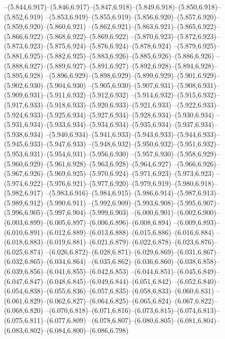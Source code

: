   --(5.844,6.917)--(5.846,6.917)--(5.847,6.918)--(5.849,6.918)--(5.850,6.918)--(5.852,6.919)%
  --(5.853,6.919)--(5.855,6.919)--(5.856,6.920)--(5.857,6.920)--(5.859,6.920)--(5.860,6.921)%
  --(5.862,6.921)--(5.863,6.921)--(5.865,6.922)--(5.866,6.922)--(5.868,6.922)--(5.869,6.922)%
  --(5.870,6.923)--(5.872,6.923)--(5.873,6.923)--(5.875,6.924)--(5.876,6.924)--(5.878,6.924)%
  --(5.879,6.925)--(5.881,6.925)--(5.882,6.925)--(5.883,6.926)--(5.885,6.926)--(5.886,6.926)%
  --(5.888,6.927)--(5.889,6.927)--(5.891,6.927)--(5.892,6.928)--(5.894,6.928)--(5.895,6.928)%
  --(5.896,6.929)--(5.898,6.929)--(5.899,6.929)--(5.901,6.929)--(5.902,6.930)--(5.904,6.930)%
  --(5.905,6.930)--(5.907,6.931)--(5.908,6.931)--(5.909,6.931)--(5.911,6.932)--(5.912,6.932)%
  --(5.914,6.932)--(5.915,6.932)--(5.917,6.933)--(5.918,6.933)--(5.920,6.933)--(5.921,6.933)%
  --(5.922,6.933)--(5.924,6.933)--(5.925,6.934)--(5.927,6.934)--(5.928,6.934)--(5.930,6.934)%
  --(5.931,6.934)--(5.933,6.934)--(5.934,6.934)--(5.935,6.934)--(5.937,6.934)--(5.938,6.934)%
  --(5.940,6.934)--(5.941,6.933)--(5.943,6.933)--(5.944,6.933)--(5.945,6.933)--(5.947,6.933)%
  --(5.948,6.932)--(5.950,6.932)--(5.951,6.932)--(5.953,6.931)--(5.954,6.931)--(5.956,6.930)%
  --(5.957,6.930)--(5.958,6.929)--(5.960,6.929)--(5.961,6.928)--(5.963,6.928)--(5.964,6.927)%
  --(5.966,6.926)--(5.967,6.926)--(5.969,6.925)--(5.970,6.924)--(5.971,6.923)--(5.973,6.923)%
  --(5.974,6.922)--(5.976,6.921)--(5.977,6.920)--(5.979,6.919)--(5.980,6.918)--(5.982,6.917)%
  --(5.983,6.916)--(5.984,6.915)--(5.986,6.914)--(5.987,6.913)--(5.989,6.912)--(5.990,6.911)%
  --(5.992,6.909)--(5.993,6.908)--(5.995,6.907)--(5.996,6.905)--(5.997,6.904)--(5.999,6.903)%
  --(6.000,6.901)--(6.002,6.900)--(6.003,6.899)--(6.005,6.897)--(6.006,6.896)--(6.008,6.894)%
  --(6.009,6.893)--(6.010,6.891)--(6.012,6.889)--(6.013,6.888)--(6.015,6.886)--(6.016,6.884)%
  --(6.018,6.883)--(6.019,6.881)--(6.021,6.879)--(6.022,6.878)--(6.023,6.876)--(6.025,6.874)%
  --(6.026,6.872)--(6.028,6.871)--(6.029,6.869)--(6.031,6.867)--(6.032,6.865)--(6.034,6.864)%
  --(6.035,6.862)--(6.036,6.860)--(6.038,6.858)--(6.039,6.856)--(6.041,6.855)--(6.042,6.853)%
  --(6.044,6.851)--(6.045,6.849)--(6.047,6.847)--(6.048,6.845)--(6.049,6.844)--(6.051,6.842)%
  --(6.052,6.840)--(6.054,6.838)--(6.055,6.836)--(6.057,6.835)--(6.058,6.833)--(6.060,6.831)%
  --(6.061,6.829)--(6.062,6.827)--(6.064,6.825)--(6.065,6.824)--(6.067,6.822)--(6.068,6.820)%
  --(6.070,6.818)--(6.071,6.816)--(6.073,6.815)--(6.074,6.813)--(6.075,6.811)--(6.077,6.809)%
  --(6.078,6.807)--(6.080,6.805)--(6.081,6.804)--(6.083,6.802)--(6.084,6.800)--(6.086,6.798)%
